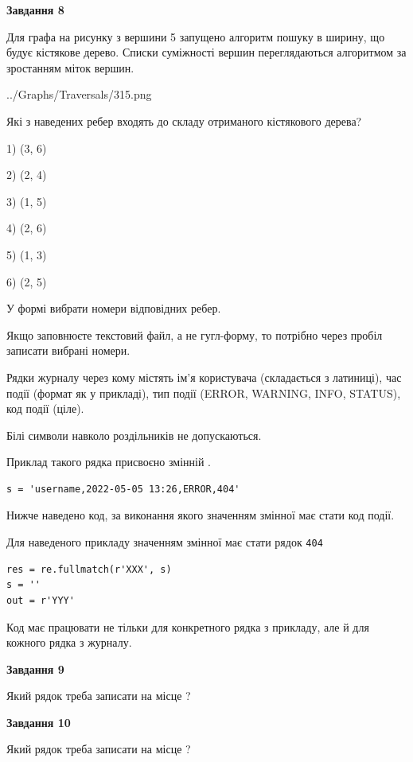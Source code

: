 \documentclass[12pt, ukrainian]{article}
\def\code#1{\Verb!#1!}
\begin{document}
{\begin {large}
{\begin {center}\textbf{Завдання 8}\end {center}}\par
Для графа на рисунку з вершини 5 запущено алгоритм пошуку в ширину, що будує кістякове дерево. Списки суміжності вершин переглядаються алгоритмом за зростанням міток вершин.\par
\begin{center}
	{../Graphs/Traversals/315.png}
\end{center}
\par Які з наведених ребер входять до складу отриманого кістякового дерева?\par
1) (3, 6)\par
2) (2, 4)\par
3) (1, 5)\par
4) (2, 6)\par
5) (1, 3)\par
6) (2, 5)\par
{\vskip 15pt} У формі вибрати номери відповідних ребер.


Якщо заповнюєте текстовий файл, а не гугл-форму, то потрібно через пробіл записа\-ти вибрані номери.\par
\newpage


Рядки журналу через кому містять ім'я користувача (складається з латиниці), час події (фор\-мат як у прикладі), тип події (ERROR, WARNING, INFO, STATUS), код події (ціле).

Білі символи навколо роздільників не допускаються.

Приклад такого рядка присвоєно змінній .



\begin{verbatim}
s = 'username,2022-05-05 13:26,ERROR,404'
\end{verbatim}


Нижче наведено код, за виконання якого значенням змінної  має стати код події.

Для наведеного прикладу значенням змінної  має стати рядок \code{404}



\begin{verbatim}
res = re.fullmatch(r'XXX', s)
s = ''
out = r'YYY'
\end{verbatim}


Код має працювати не тільки для конкретного рядка з прикладу, але й для кожного рядка з журналу.

{\begin {center}\textbf{Завдання 9}\end {center}}\par
Який рядок треба записати на місце  ?\par
\vspace{5mm}


{\begin {center}\textbf{Завдання 10}\end {center}}\par
Який рядок треба записати на місце  ?\par


\newpage


\end {large}}
\end{document}
